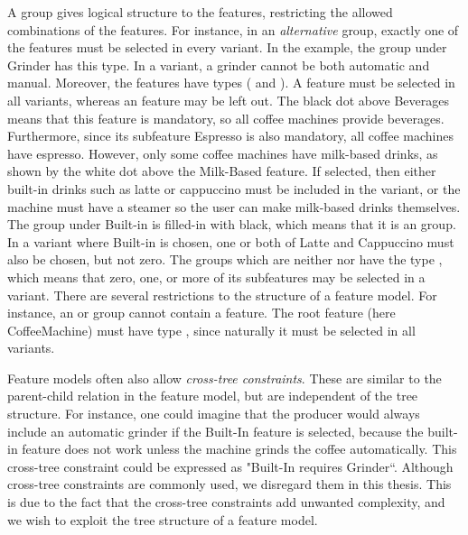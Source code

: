 A group gives logical structure to the features, restricting the allowed combinations of the features. For instance, in an \emph{alternative} group, exactly one of the features must be selected in every variant. In the example, the group under Grinder has this type. In a variant, a grinder cannot be both automatic and manual. Moreover, the features have types (\optional{} and \mandatory{}). A \mandatory{} feature must be selected in all variants, whereas an \optional{} feature may be left out. The black dot above Beverages means that this feature is mandatory, so all coffee machines provide beverages. Furthermore, since its subfeature Espresso is also mandatory, all coffee machines have espresso. However, only some coffee machines have milk-based drinks, as shown by the white dot above the Milk-Based feature. If selected, then either built-in drinks such as latte or cappuccino must be included in the variant, or the machine must have a steamer so the user can make milk-based drinks themselves. The group under Built-in is filled-in with black, which means that it is an \ortype{} group. In a variant where Built-in is chosen, one or both of Latte and Cappuccino must also be chosen, but not zero. The groups which are neither \xortype{} nor \ortype{} have the type \andtype{}, which means that zero, one, or more of its subfeatures may be selected in a variant. There are several restrictions to the structure of a feature model. For instance, an \xortype{} or \ortype{} group cannot contain a \mandatory{} feature. The root feature (here CoffeeMachine) must have type \mandatory{}, since naturally it must be selected in all variants.

Feature models often also allow \emph{cross-tree constraints}. These are similar to the parent-child relation in the feature model, but are independent of the tree structure. For instance, one could imagine that the producer would always include an automatic grinder if the Built-In feature is selected, because the built-in feature does not work unless the machine grinds the coffee automatically. This cross-tree constraint could be expressed as "Built-In requires Grinder``. Although cross-tree constraints are commonly used, we disregard them in this thesis. This is due to the fact that the cross-tree constraints add unwanted complexity, and we wish to exploit the tree structure of a feature model.

